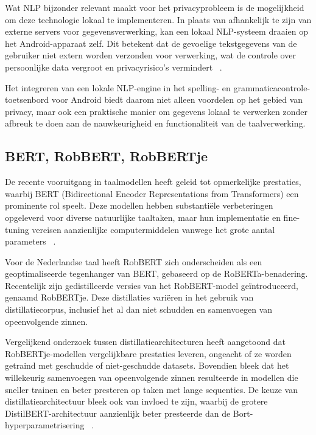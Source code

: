 Wat NLP bijzonder relevant maakt voor het privacyprobleem is de mogelijkheid om deze technologie lokaal te implementeren. In plaats van afhankelijk te zijn van externe servers voor gegevensverwerking, kan een lokaal NLP-systeem draaien op het Android-apparaat zelf. Dit betekent dat de gevoelige tekstgegevens van de gebruiker niet extern worden verzonden voor verwerking, wat de controle over persoonlijke data vergroot en pri\-va\-cy\-risico's ver\-min\-dert ~\autocite{Cistac2019}.

Het integreren van een lokale NLP-engine in het spelling- en grammaticacontrole-toetsenbord voor Android biedt daarom niet alleen voordelen op het gebied van privacy, maar ook een praktische manier om gegevens lokaal te verwerken zonder afbreuk te doen aan de nauwkeurigheid en functionaliteit van de taalverwerking.

\subsection{BERT, RobBERT, RobBERTje}
De recente vooruitgang in taalmodellen heeft geleid tot opmerkelijke prestaties, waarbij BERT (Bidirectional Encoder Representations from Tran\-s\-for\-mers) een prominente rol speelt. Deze modellen hebben substantiële verbeteringen opgeleverd voor diverse natuurlijke taaltaken, maar hun implementatie en fine-tuning vereisen aanzienlijke computermiddelen vanwege het grote aantal parameters ~\autocite{Delobelle2020}.

Voor de Nederlandse taal heeft RobBERT zich onderscheiden als een geoptimaliseerde tegenhanger van BERT, gebaseerd op de RoBERTa-be\-na\-de\-ring. Recentelijk zijn gedistilleerde versies van het RobBERT-model geïntroduceerd, ge\-naa\-md RobBERTje. Deze distillaties variëren in het gebruik van distillatiecorpus, inclusief het al dan niet schudden en samenvoegen van opeenvolgende zinnen. ~\autocite{Delobelle2021}

Vergelijkend onderzoek tussen distillatiearchitecturen heeft aangetoond dat \\ RobBERTje-mo\-del\-len vergelijkbare prestaties leveren, ongeacht of ze worden getraind met geschudde of niet-geschudde datasets. Bovendien bleek dat het willekeurig samenvoegen van opeenvolgende zinnen resulteerde in modellen die sneller trainen en beter presteren op taken met lange sequenties. De keuze van distillatiearchitectuur bleek ook van invloed te zijn, waarbij de grotere DistilBERT-arch\-i\-tec\-tuur aanzienlijk beter presteerde dan de Bort-hyperparametrisering ~\autocite{Delobelle2021}.

